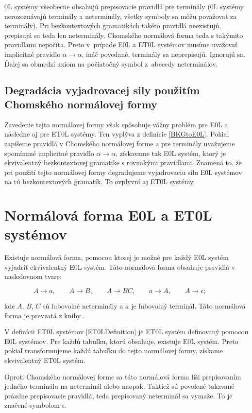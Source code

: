 0L systémy všeobecne obsahujú prepisovacie pravidlá pre terminály (0L systémy nerozoznávajú terminály a neterminály, všetky symboly sa môžu považovať za terminály). Pri bezkontextových gramatikách takéto pravidlá neexistujú, prepisujú sa teda len neterminály. Chomského normálová forma teda s takýmito pravidlami nepočíta. Preto v~prípade E0L a ET0L systémov musíme uvažovať implicitné pravidlo $\alpha \to \alpha$, ináč povedané, terminály sa neprepisujú. Ignorujú sa. Ďalej sa obmedzí axiom na počiatočný symbol z~abecedy neterminálov.

\subsection*{Degradácia vyjadrovacej sily použitím Chomského normálovej formy}


Zavedenie tejto normálovej formy však spôsobuje vážny problém pre E0L a následne aj pre ET0L systémy. Ten vyplýva z definície \ref{BKGtoE0L}. Pokiaľ zapíšeme pravidlá v Chomského normálovej forme a pre terminály uvažujeme spomínané implicitné pravidlo $\alpha \to \alpha$, získavame tak E0L systém, ktorý je ekvivalentný bezkontextovej gramatike s rovnakými pravidlami. Znamená to, že pri použití tejto normálovej formy degradujeme vyjadrovaciu silu E0L systémov na tú bezkontextových gramatík. To ovplyvní aj ET0L systémy.

\section{Normálová forma E0L a ET0L systémov}
\label{E0LNormalForm}
Existuje normálová forma, pomocou ktorej je možné pre každý E0L systém vyjadriť ekvivalentný E0L systém. Táto normálová forma obsahuje pravidlá v nasledovnom tvare:

\[
    A \to a, \quad\quad A \to B, \quad\quad A \to BC, \quad\quad a \to A, \quad\quad A \to \epsilon; \quad \quad
\]

kde $A$, $B$, $C$ sú ľubovoľné neterminály a $a$ je ľubovoľný terminál. Táto normálová forma je prevzatá z knihy \cite{mathTheoryL}.

V definícii ET0L systémov \ref{ET0LDefinition} je ET0L systém definovaný pomocou E0L systémov. Pre každú tabuľku, ktorú obsahuje, existuje E0L systém. Preto pokiaľ transformujeme každú tabuľku do tejto normálovej formy, získame ekvivalentný ET0L systém.

Oproti Chomského normálovej forme sa táto normálová forma líši prepisovaním jedného terminálu na neterminál alebo naopak. Taktiež sú povolené takzvané prázdne prepisovacie pravidlá, teda prepisovaný neterminál sa vymaže. To je značené symbolom $\epsilon$.



